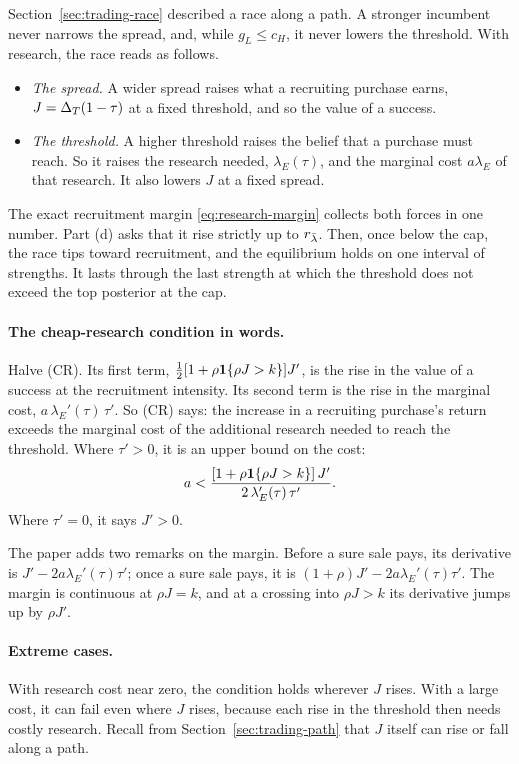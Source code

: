 Section~\ref{sec:trading-race} described a race along a path. A stronger incumbent never narrows the spread, and,
while \(g_L\le c_H\), it never lowers the threshold. With research, the race reads as follows.
\begin{itemize}
\item \emph{The spread.} A wider spread raises what a recruiting purchase earns, \(J=\Delta_T(1-\tau)\) at a fixed
threshold, and so the value of a success.
\item \emph{The threshold.} A higher threshold raises the belief that a purchase must reach. So it raises the
research needed, \(\lambda_E(\tau)\), and the marginal cost \(a\lambda_E\) of that research. It also lowers \(J\) at a
fixed spread.
\end{itemize}
The exact recruitment margin \eqref{eq:research-margin} collects both forces in one number. Part (d) asks that it
rise strictly up to \(r_{\bar\lambda}\). Then, once below the cap, the race tips toward recruitment, and the equilibrium holds
on one interval of strengths. It lasts through the last strength at which the threshold does not exceed the top
posterior at the cap.

\paragraph{The cheap-research condition in words.} Halve (CR). Its first term, \(\tfrac12[1+\rho\mathbf{1}\{\rho J>k\}]J'\), is
the rise in the value of a success at the recruitment intensity. Its second term is the rise in the marginal cost,
\(a\,\lambda_E'(\tau)\,\tau'\). So (CR) says: the increase in a recruiting purchase's return exceeds the marginal cost
of the additional research needed to reach the threshold. Where \(\tau'>0\), it is an upper bound on the cost:
\[
a<\frac{[1+\rho\mathbf{1}\{\rho J>k\}]\,J'}{2\,\lambda_E'(\tau)\,\tau'} .
\]
Where \(\tau'=0\), it says \(J'>0\).

The paper adds two remarks on the margin. Before a sure sale pays, its derivative is \(J'-2a\lambda_E'(\tau)\tau'\);
once a sure sale pays, it is \((1+\rho)J'-2a\lambda_E'(\tau)\tau'\). The margin is continuous at \(\rho J=k\), and at a
crossing into \(\rho J>k\) its derivative jumps up by \(\rho J'\).

\paragraph{Extreme cases.} With research cost near zero, the condition holds wherever \(J\) rises. With a large cost,
it can fail even where \(J\) rises, because each rise in the threshold then needs costly research. Recall from
Section~\ref{sec:trading-path} that \(J\) itself can rise or fall along a path.

